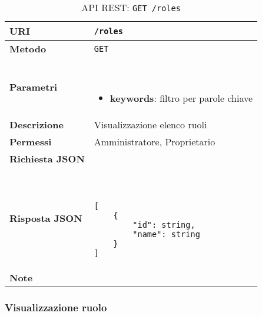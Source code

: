         \begin{table}[H]
            \begin{center}
                \begin{tabular}{p{} p{}}
                    \toprule
                    \textbf{URI} & \texttt{/roles} \\ \midrule
                    \textbf{Metodo} & \texttt{GET} \\ \midrule
                    \textbf{Parametri} & \
                        \begin{itemize}
                            \item \textbf{keywords}: filtro per parole chiave
                        \end{itemize}
                        \\ \midrule
                    \textbf{Descrizione} & Visualizzazione elenco ruoli \\ \midrule
                    \textbf{Permessi} & Amministratore, Proprietario  \\ \midrule
                    \textbf{Richiesta JSON} & \\ \midrule
                    \textbf{Risposta JSON} & \
                        \begin{lstlisting}[basicstyle={\ttfamily}]
[
    {
        "id": string,
        "name": string
    }
]
                        \end{lstlisting}
                        \\ \midrule
                    \textbf{Note} & \\
                    \bottomrule
                \end{tabular}
                \caption{API REST: \texttt{GET /roles}}
            \end{center}
        \end{table}

    \subsubsection{Visualizzazione ruolo}


